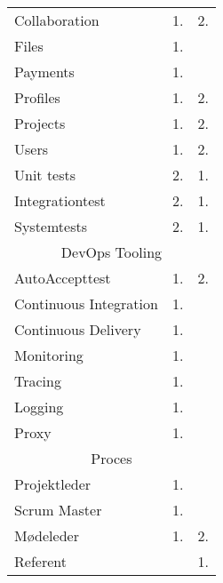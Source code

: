 \begin{table}[H]
\begin{tabular}{lcc}
    Collaboration          & 1.              & 2.             \\
    Files                  & 1.              &                \\
    Payments               & 1.              &                \\
    Profiles               & 1.              & 2.             \\
    Projects               & 1.              & 2.             \\
    Users                  & 1.              & 2.             \\
    Unit tests             & 2.              & 1.             \\
    Integrationtest        & 2.              & 1.             \\ 
    Systemtests            & 2.              & 1.             \\ \hline
    \multicolumn{3}{c}{DevOps Tooling}                        \\ \hline
    AutoAccepttest         & 1.              & 2.             \\
    Continuous Integration & 1.              &                \\
    Continuous Delivery    & 1.              &                \\
    Monitoring             & 1.              &                \\
    Tracing                & 1.              &                \\
    Logging                & 1.              &                \\
    Proxy                  & 1.              &                \\ \hline
    \multicolumn{3}{c}{Proces}                                \\ \hline

    Projektleder           & 1.              &                \\
    Scrum Master           & 1.              &                \\
    Mødeleder              & 1.              & 2.             \\
    Referent               &                 & 1.             \\
  \end{tabular}
\end{table}